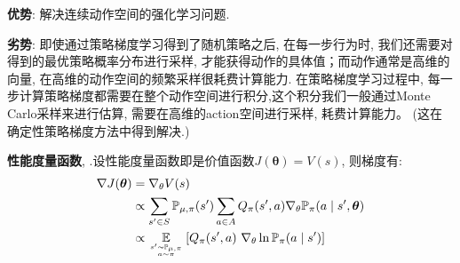 \documentclass{article}
\newcommand{\env}[2]{\begin{#1}#2\end{#1}}
\begin{document}
        \textbf{优势}: 解决连续动作空间的强化学习问题.

        \textbf{劣势}:
            即使通过策略梯度学习得到了随机策略之后, 在每一步行为时, 我们还需要对得到的最优策略概率分布进行采样, 才能获得动作的具体值；而动作通常是高维的向量, 在高维的动作空间的频繁采样很耗费计算能力. 在策略梯度学习过程中, 每一步计算策略梯度都需要在整个动作空间进行积分,这个积分我们一般通过Monte Carlo采样来进行估算, 需要在高维的action空间进行采样, 耗费计算能力。 (这在确定性策略梯度方法中得到解决.)

        \textbf{性能度量函数}, .设性能度量函数即是价值函数$J(\boldsymbol{\theta}) = V(s)$, 则梯度有:
            \env{align*}{
                \nabla J(\boldsymbol{\theta}) &= \nabla_\theta V(s) \\
                &\propto \sum\limits_{s' \in S} \mathbb P_{\mu, \pi}(s') \sum\limits_{a \in A} Q_{\pi}(s', a) \nabla_{\theta} \mathbb{P}_\pi(a \mid s', \boldsymbol{\theta}) \\
                & \propto \underset{s' \sim \mathbb P_{\mu, \pi} \atop a \sim \pi}{\mathbb E} \left[Q_{\pi}(s', a)\  \nabla_\theta \ln \mathbb{P}_\pi (a \mid s') \right]
            }
        
\end{document}
